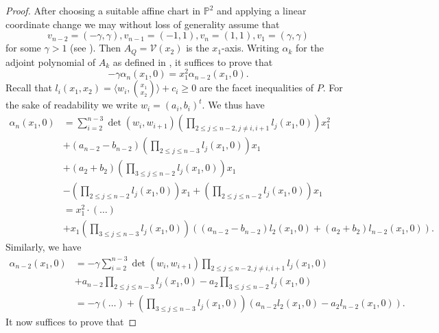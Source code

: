 \documentclass[10pt,a4paper]{amsart}
\newcommand{\cV}{{\mathcal V}}
\newcommand{\pp}{\mathbb{P}}
\begin{document}
\begin{proof}
 After choosing a suitable affine chart in $\pp^2$ and applying a linear coordinate change we may without loss of generality assume that
 \begin{equation*}
     v_{n-2} = (-\gamma,\gamma), v_{n-1} = (-1,1), v_n = (1,1), v_1 = (\gamma,\gamma)
 \end{equation*}
 for some $\gamma > 1$ (see ). Then $A_Q = \cV(x_2)$ is the $x_1$-axis. Writing $\alpha_k$ for the adjoint polynomial of $A_k$ as defined in , it suffices to prove that
 \begin{equation*}
     -\gamma\alpha_n(x_1,0) = x_1^2\alpha_{n-2}(x_1,0).
 \end{equation*}
 Recall that $l_i(x_1,x_2) = \langle w_i, \binom{x_1}{x_2} \rangle + c_i \geq 0$ are the facet inequalities of $P$. For the sake of readability we write $w_i = (a_i,b_i)^t$. We thus have 
 \begin{equation*}
 \begin{split}
     \alpha_n(x_1,0) &= \sum_{i=2}^{n-3} \det(w_i,w_{i+1}) \left(\prod_{2\leq j\leq n-2, j\neq i,i+1} l_j(x_1,0)\right) x_1^2 \\
     &+ (a_{n-2}-b_{n-2})\left(\prod_{2\leq j \leq n-3} l_j(x_1,0)\right) x_1\\ & + (a_2+b_2)\left(\prod_{3\leq j \leq n-2} l_j(x_1,0)\right) x_1\\
     &- \left(\prod_{2\leq j \leq n-2} l_j(x_1,0)\right) x_1 + \left(\prod_{2\leq j \leq n-2} l_j(x_1,0)\right) x_1 \\
    &= x_1^2 \cdot(\dots)\\ & + x_1 \left(\prod_{3\leq j\leq n-3} l_j(x_1,0)\right)((a_{n-2}-b_{n-2})l_2(x_1,0) + (a_2+b_2)l_{n-2}(x_1,0)).
 \end{split}
 \end{equation*}
 Similarly, we have
 \begin{equation*}
 \begin{split}
     \alpha_{n-2}(x_1,0) &= -\gamma \sum_{i=2}^{n-3} \det(w_i,w_{i+1}) \prod_{2\leq j\leq n-2, j\neq i,i+1} l_j(x_1,0) \\
     & + a_{n-2} \prod_{2\leq j\leq n-3} l_j(x_1,0) - a_2 \prod_{3\leq j\leq n-2} l_j(x_1,0) \\
     &= -\gamma(\dots) + \left(\prod_{3\leq j\leq n-3} l_j(x_1,0)\right)(a_{n-2}l_2(x_1,0) - a_2l_{n-2}(x_1,0)).
 \end{split}
 \end{equation*}
 It now suffices to prove that

\end{proof}
\end{document}
